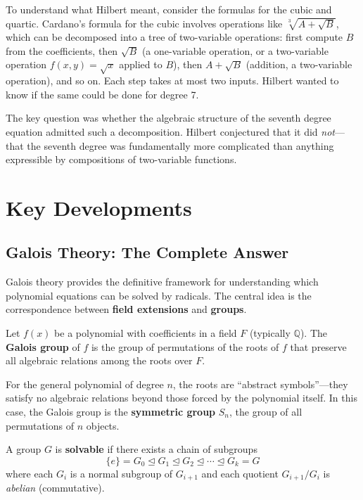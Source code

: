 To understand what Hilbert meant, consider the formulas for the cubic and quartic. Cardano's formula for the cubic involves operations like $\sqrt[3]{A + \sqrt{B}}$, which can be decomposed into a tree of two-variable operations: first compute $B$ from the coefficients, then $\sqrt{B}$ (a one-variable operation, or a two-variable operation $f(x,y) = \sqrt{x}$ applied to $B$), then $A + \sqrt{B}$ (addition, a two-variable operation), and so on. Each step takes at most two inputs. Hilbert wanted to know if the same could be done for degree 7.

The key question was whether the algebraic structure of the seventh degree equation admitted such a decomposition. Hilbert conjectured that it did \emph{not}---that the seventh degree was fundamentally more complicated than anything expressible by compositions of two-variable functions.

\section{Key Developments}

\subsection{Galois Theory: The Complete Answer}

Galois theory provides the definitive framework for understanding which polynomial equations can be solved by radicals. The central idea is the correspondence between \textbf{field extensions} and \textbf{groups}.

\begin{definition}
Let $f(x)$ be a polynomial with coefficients in a field $F$ (typically $\mathbb{Q}$). The \textbf{Galois group} of $f$ is the group of permutations of the roots of $f$ that preserve all algebraic relations among the roots over $F$.
\end{definition}

For the general polynomial of degree $n$, the roots are ``abstract symbols''---they satisfy no algebraic relations beyond those forced by the polynomial itself. In this case, the Galois group is the \textbf{symmetric group} $S_n$, the group of all permutations of $n$ objects.

\begin{definition}
A group $G$ is \textbf{solvable} if there exists a chain of subgroups
\[
    \{e\} = G_0 \trianglelefteq G_1 \trianglelefteq G_2 \trianglelefteq \cdots \trianglelefteq G_k = G
\]
where each $G_i$ is a normal subgroup of $G_{i+1}$ and each quotient $G_{i+1}/G_i$ is \emph{abelian} (commutative).
\end{definition}

